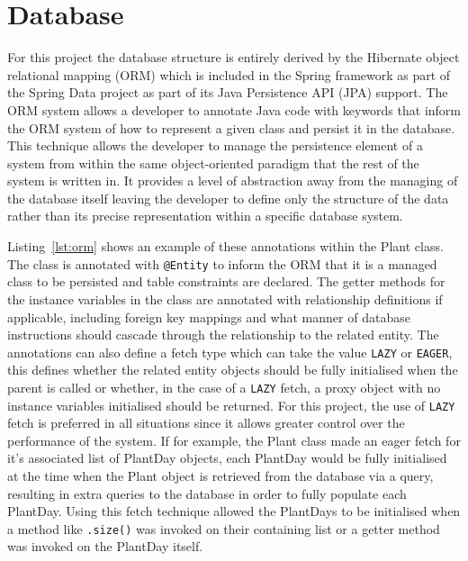 \section{Database} \label{db}

For this project the database structure is entirely derived by the Hibernate\cite{_hibernate} object relational mapping (ORM) which is included in the Spring framework as part of the Spring Data project as part of its Java Persistence API (JPA) support. The ORM system allows a developer to annotate Java code with keywords that inform the ORM system of how to represent a given class and persist it in the database. This technique allows the developer to manage the persistence element of a system from within the same object-oriented paradigm that the rest of the system is written in. It provides a level of abstraction away from the managing of the database itself leaving the developer to define only the structure of the data rather than its precise representation within a specific database system.

 Listing~\ref{lst:orm} shows an example of these annotations within the Plant class. The class is annotated with \texttt{@Entity} to inform the ORM that it is a managed class to be persisted and table constraints are declared. The getter methods for the instance variables in the class are annotated with relationship definitions if applicable, including foreign key mappings and what manner of database instructions should cascade through the relationship to the related entity. The annotations can also define a fetch type which can take the value \texttt{LAZY} or \texttt{EAGER}, this defines whether the related entity objects should be fully initialised when the parent is called or whether, in the case of a \texttt{LAZY} fetch, a proxy object with no instance variables initialised should be returned. For this project, the use of \texttt{LAZY} fetch is preferred in all situations since it allows greater control over the performance of the system. If for example, the Plant class made an eager fetch for it's associated list of PlantDay objects, each PlantDay would be fully initialised at the time when the Plant object is retrieved from the database via a query, resulting in extra queries to the database in order to fully populate each PlantDay. Using this fetch technique allowed the PlantDays to be initialised when a method like \texttt{.size()} was invoked on their containing list or a getter method was invoked on the PlantDay itself. 

\lstjava


